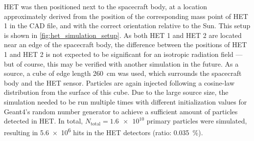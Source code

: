\ac{HET} was then positioned next to the spacecraft body, at a location approximately derived from the position of the corresponding mass point of \ac{HET} 1 in the \ac{CAD} file, and with the correct orientation relative to the Sun. This setup is shown in \autoref{fig:het_simulation_setup}. As both \ac{HET} 1 and \ac{HET} 2 are located near an edge of the spacecraft body, the difference between the positions of \ac{HET} 1 and \ac{HET} 2 is not expected to be significant for an isotropic radiation field --- but of course, this may be verified with another simulation in the future. As a source, a cube of edge length \SI{260}{\centi\meter} was used, which surrounds the spacecraft body and the \ac{HET} sensor. Particles are again injected following a cosine-law distribution from the surface of this cube. Due to the large source size, the simulation needed to be run multiple times with different initialization values for \ac{Geant4}'s random number generator to achieve a sufficient amount of particles detected in \ac{HET}. In total, $N_\text{total} = \num{1.6e10}$ primary particles were simulated, resulting in \num{5.6e6} hits in the \ac{HET} detectors (ratio: \SI{0.035}{\percent}).


